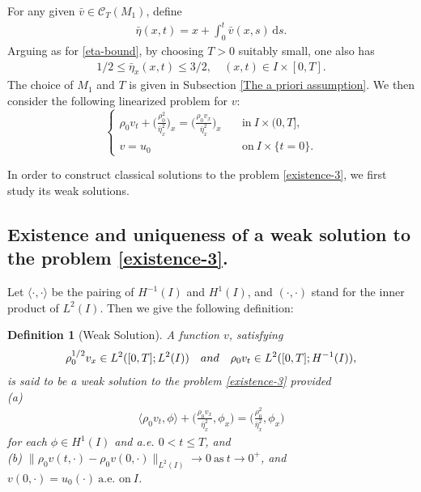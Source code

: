 \documentclass[11pt, reqno]{amsart}
\newcommand{\diff}{\mathrm{d}}
\newtheorem{definition}{Definition}
\numberwithin{equation}{section}
\begin{document}
{For any given \(\bar{v}\in\mathcal{C}_T(M_1)\), define
\begin{align}\label{existence-1}
	\bar{\eta}(x,t)=x+\int_0^t\bar{v}(x,s)\,\diff s.
\end{align}
Arguing as for \eqref{eta-bound}, by choosing \(T>0\) suitably small, one also has
\begin{align}\label{eta-bound-2}
	1/2\leq \bar{\eta}_x(x,t)\leq 3/2,\quad (x,t)\in I\times [0,T].
\end{align}
The choice of  \(M_1\) and \(T\) is given in Subsection \ref{The a priori assumption}.
We then consider the following
linearized problem for \(v\):
\begin{equation}\label{existence-3}
	\begin{cases}
		\rho_0v_t+\big({\frac{\rho_0^2}{\bar{\eta}_x^2}}\big)_x
		=\big(\frac{\rho_0v_x}{\bar{\eta}_x^2}\big)_x &\quad \mbox{in}\ I\times (0,T],\\
		v=u_0 &\quad \mbox{on}\ I\times \{t=0\}.
	\end{cases}
\end{equation}



In order to construct classical solutions to the problem \eqref{existence-3}, we first study its weak solutions.
\subsection{Existence and uniqueness of a weak solution to the problem \eqref{existence-3}.}\label{weak solution}
 Let \(\langle\cdot, \cdot\rangle\) be the pairing of \(H^{-1}(I)\) and \(H^1(I)\), and \((\cdot,\cdot)\) stand for the inner product of \(L^2(I)\). Then we give the following definition:
\begin{definition}[Weak Solution]\label{Weak Solution} A function \(v\), satisfying
	\begin{equation*}
		\begin{aligned}
		\rho_0^{1/2}v_x\in L^2([0,T];L^2(I))\quad {\rm{and}}\quad \rho_0 v_t\in L^2([0,T];H^{-1}(I)),
		\end{aligned}
	\end{equation*}
	is said to be a weak solution to the problem \eqref{existence-3} provided\\	
	{\rm{(a)}}
	\begin{equation*}
		\begin{aligned}
			\langle\rho_0v_t, \phi\rangle+\bigg(\frac{\rho_0v_x}{\bar{\eta}_x^2}, \phi_x\bigg)=\bigg({\frac{\rho_0^2}{\bar{\eta}_x^2}}, \phi_x\bigg)
		\end{aligned}
	\end{equation*}	
	for each \(\phi\in H^1(I)\) and a.e. \(0< t\leq T\), and\\
	{\rm{(b)}} \(\|\rho_0v(t,\cdot)-\rho_0v(0, \cdot)\|_{L^2(I)}\to 0\ \text{as}\ t\to 0^+\), and $v(0,\cdot)=u_0(\cdot) \ \mbox{a.e.\ on}\ I$. 
\end{definition}

}
\end{document}
